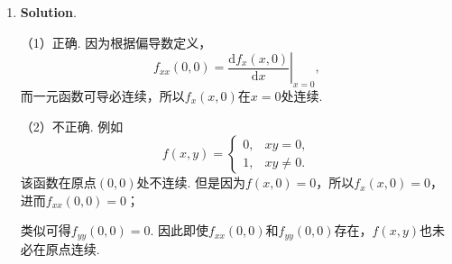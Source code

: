 \documentclass[../main.tex]{subfiles}
\begin{document}
\begin{enumerate}
    \item \textbf{Solution}.

          （1）正确. 因为根据偏导数定义，
          \[
              f_{xx}(0,0)=\left.\frac{\mathrm{d}f_{x}(x,0)}{\mathrm{d}x}\right|_{x=0},
          \]
          而一元函数可导必连续，所以$f_{x}(x,0)$在$x=0$处连续.

          （2）不正确. 例如
          \[
              f(x,y)=
              \begin{cases}
                  0, & xy=0,    \\
                  1, & xy\neq0.
              \end{cases}
          \]
          该函数在原点$(0,0)$处不连续. 但是因为$f(x,0)=0$，所以$f_{x}(x,0)=0$，进而$f
                  _{xx}(0,0)=0$；

          类似可得$f_{yy}(0,0)=0$. 因此即使$f_{xx}(0,0)$和$f_{yy}(0,0)$存在，$f(x,y)$也未必在原点连续.
\end{enumerate}
\end{document}
